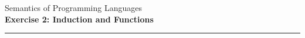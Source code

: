 \documentclass[10pt,a4paper]{exam}
\begin{document}
\newcommand{\course}{Semantics of Programming Languages}
\newcommand{\week}{2}
\newcommand{\topics}{Induction and Functions}

\everymath{\color{campurpledark}}
\everydisplay{\color{campurpledark}}




\marksnotpoints
\pointsdroppedatright
\marksnotpoints
\marginpointname{ \points}

\begin{center}
\Large {\color{campurpledark} \course} \\[-0.2cm]
\LARGE \textbf{\color{campurpledark} Exercise \week: \topics} \\
\end{center}

{\color{campurple}\hrule}

\newcommand{\metavar}[1]{{\color{campurple}#1}}

\theoremstyle{definition}
\newtheorem{mydef}{Definition}
\end{document}
